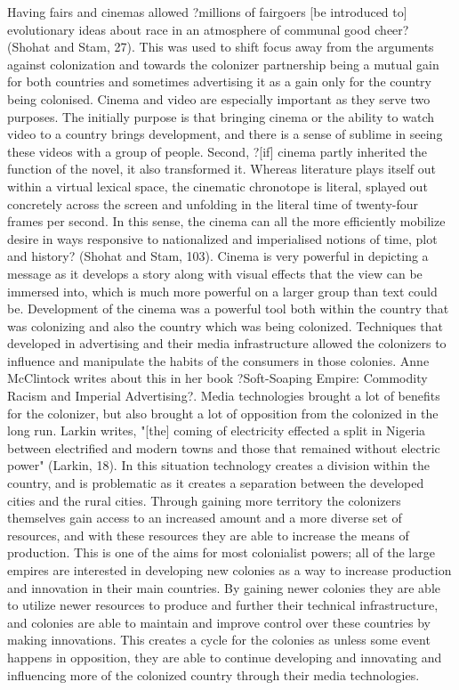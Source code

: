\documentclass[12pt, oneside]{article}
\begin{document}
Having fairs and cinemas allowed ?millions of fairgoers [be introduced to] evolutionary ideas about race in an atmosphere of communal good cheer? (Shohat and Stam, 27). This was used to shift focus away from the arguments against colonization and towards the colonizer partnership being a mutual gain for both countries and sometimes advertising it as a gain only for the country being colonised. Cinema and video are especially important as they serve two purposes. The initially purpose is that bringing cinema or the ability to watch video to a country brings development, and there is a sense of sublime in seeing these videos with a group of people. Second, ?[if] cinema partly inherited the function of the novel, it also transformed it. Whereas literature plays itself out within a virtual lexical space, the cinematic chronotope is literal, splayed out concretely across the screen and unfolding in the literal time of twenty-four frames per second. In this sense, the cinema can all the more efficiently mobilize desire in ways responsive to nationalized and imperialised notions of time, plot and history? (Shohat and Stam, 103). Cinema is very powerful in depicting a message as it develops a story along with visual effects that the view can be immersed into, which is much more powerful on a larger group than text could be. Development of the cinema was a powerful tool both within the country that was colonizing and also the country which was being colonized.
Techniques that developed in advertising and their media infrastructure allowed the colonizers to influence and manipulate the habits of the consumers in those colonies. Anne McClintock writes about this in her book ?Soft-Soaping Empire: Commodity Racism and Imperial Advertising?. 
Media technologies brought a lot of benefits for the colonizer, but also brought a lot of opposition from the colonized in the long run. Larkin writes, "[the] coming of electricity effected a split in Nigeria between electrified and modern towns and those that remained without electric power" (Larkin, 18). In this situation technology creates a division within the country, and is problematic as it creates a separation between the developed cities and the rural cities. 
Through gaining more territory the colonizers themselves gain access to an increased amount and a more diverse set of resources, and with these resources they are able to increase the means of production. This is one of the aims for most colonialist powers; all of the large empires are interested in developing new colonies as a way to increase production and innovation in their main countries. By gaining newer colonies they are able to utilize newer resources to produce and further their technical infrastructure, and colonies are able to maintain and improve control over these countries by making innovations. This creates a cycle for the colonies as unless some event happens in opposition, they are able to continue developing and innovating and influencing more of the colonized country through their media technologies.
\end{document}
